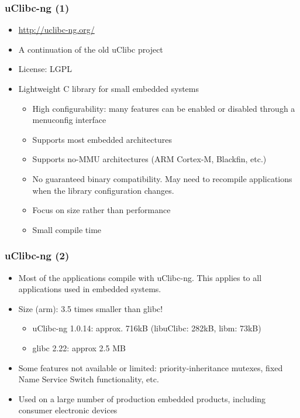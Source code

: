 \begin{frame}
  \frametitle{uClibc-ng (1)}
  \begin{itemize}
  \item \url{http://uclibc-ng.org/}
  \item A continuation of the old uClibc project
  \item License: LGPL
  \item Lightweight C library for small embedded systems
    \begin{itemize}
    \item High configurability: many features can be enabled or
      disabled through a menuconfig interface
    \item Supports most embedded architectures
    \item Supports no-MMU architectures (ARM Cortex-M, Blackfin, etc.)
    \item No guaranteed binary compatibility. May need to
      recompile applications when the library configuration changes.
    \item Focus on size rather than performance
    \item Small compile time
    \end{itemize}
  \end{itemize}
\end{frame}

\begin{frame}
  \frametitle{uClibc-ng (2)}
  \begin{itemize}
  \item Most of the applications compile with uClibc-ng. This applies to
    all applications used in embedded systems.
  \item Size (arm): 3.5 times smaller than glibc!
    \begin{itemize}
    \item uClibc-ng 1.0.14: approx. 716kB (libuClibc: 282kB, libm:
      73kB)
    \item glibc 2.22: approx 2.5 MB
    \end{itemize}
  \item Some features not available or limited: priority-inheritance
    mutexes, fixed Name Service Switch functionality, etc.
  \item Used on a large number of production embedded products,
    including consumer electronic devices
\end{itemize}
\end{frame}

